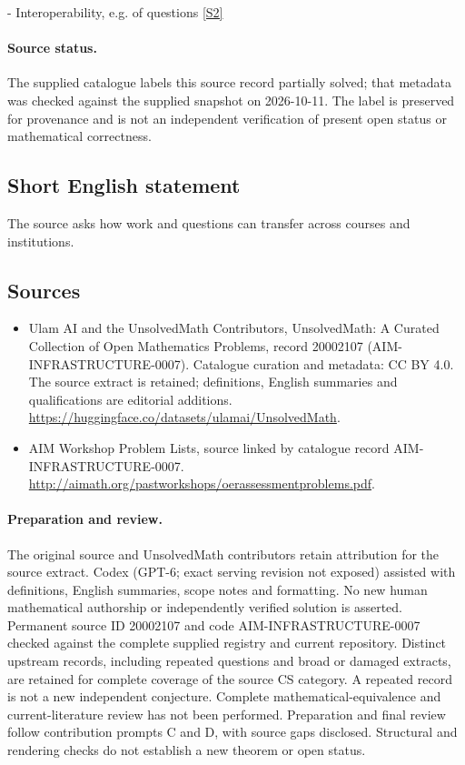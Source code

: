 \documentclass[11pt]{article}
\newcommand{\sref}[2]{\hyperlink{source:#1:#2}{[S#2]}}
\begin{document}
- Interoperability, e.g. of questions \sref{20002107}{2}
\paragraph{Source status.}
The supplied catalogue labels this source record partially solved; that metadata was checked against the supplied snapshot on 2026-10-11. The label is preserved for provenance and is not an independent verification of present open status or mathematical correctness.
\subsection{Short English statement}
The source asks how work and questions can transfer across courses and institutions.
\subsection{Sources}
\begin{itemize}
\item[\hypertarget{source:20002107:1}{S1}] Ulam AI and the UnsolvedMath Contributors, UnsolvedMath: A Curated Collection of Open Mathematics Problems, record 20002107 (AIM-INFRASTRUCTURE-0007). Catalogue curation and metadata: CC BY 4.0. The source extract is retained; definitions, English summaries and qualifications are editorial additions.
\url{https://huggingface.co/datasets/ulamai/UnsolvedMath}.
\item[\hypertarget{source:20002107:2}{S2}] AIM Workshop Problem Lists, source linked by catalogue record AIM-INFRASTRUCTURE-0007.
\url{http://aimath.org/pastworkshops/oerassessmentproblems.pdf}.
\end{itemize}
\paragraph{Preparation and review.}
The original source and UnsolvedMath contributors retain attribution for the source extract. Codex (GPT-6; exact serving revision not exposed) assisted with definitions, English summaries, scope notes and formatting. No new human mathematical authorship or independently verified solution is asserted. Permanent source ID 20002107 and code AIM-INFRASTRUCTURE-0007 checked against the complete supplied registry and current repository. Distinct upstream records, including repeated questions and broad or damaged extracts, are retained for complete coverage of the source CS category. A repeated record is not a new independent conjecture. Complete mathematical-equivalence and current-literature review has not been performed. Preparation and final review follow contribution prompts C and D, with source gaps disclosed. Structural and rendering checks do not establish a new theorem or open status.
\label{end:20002107}
\end{document}
